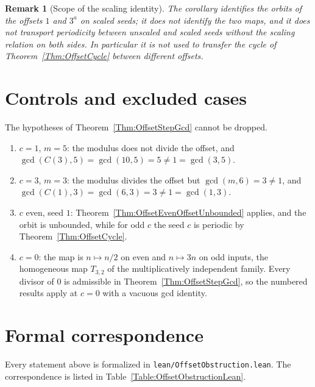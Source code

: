 \documentclass[11pt,letterpaper]{article}
\newtheorem{remark}[theorem]{Remark}
\begin{document}
\begin{remark}[Scope of the scaling identity]\label{Rem:OffsetScalingScope}
The corollary identifies the orbits of the offsets $1$ and $3^{a}$ on scaled
seeds; it does not identify the two maps, and it does not transport
periodicity between unscaled and scaled seeds without the scaling relation on
both sides. In particular it is not used to transfer the cycle of
Theorem~\ref{Thm:OffsetCycle} between different offsets.
\end{remark}

\section{Controls and excluded cases}

The hypotheses of Theorem~\ref{Thm:OffsetStepGcd} cannot be dropped.

\begin{enumerate}[label=(\roman*)]
 \item $c=1$, $m=5$: the modulus does not divide the offset, and
 $\gcd(C(3),5)=\gcd(10,5)=5\ne1=\gcd(3,5)$.
 \item $c=3$, $m=3$: the modulus divides the offset but
 $\gcd(m,6)=3\ne1$, and $\gcd(C(1),3)=\gcd(6,3)=3\ne1=\gcd(1,3)$.
 \item $c$ even, seed $1$: Theorem~\ref{Thm:OffsetEvenOffsetUnbounded}
 applies, and the orbit is unbounded, while for odd $c$ the seed $c$ is
 periodic by Theorem~\ref{Thm:OffsetCycle}.
 \item $c=0$: the map is $n\mapsto n/2$ on even and $n\mapsto3n$ on odd
 inputs, the homogeneous map $T_{3,2}$ of the multiplicatively independent
 family. Every divisor of $0$ is admissible in
 Theorem~\ref{Thm:OffsetStepGcd}, so the numbered results apply at $c=0$ with a
 vacuous gcd identity.
\end{enumerate}

\section{Formal correspondence}

Every statement above is formalized in \texttt{lean/OffsetObstruction.lean}.
The correspondence is listed in Table~\ref{Table:OffsetObstructionLean}.
\end{document}
